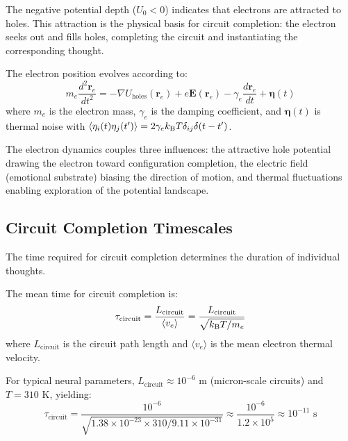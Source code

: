 The negative potential depth ($U_0 < 0$) indicates that electrons are attracted to holes. This attraction is the physical basis for circuit completion: the electron seeks out and fills holes, completing the circuit and instantiating the corresponding thought.

\begin{theorem}
\label{thm:electron_motion}
The electron position evolves according to:
\begin{equation}
m_e \frac{d^2 \mathbf{r}_e}{dt^2} = -\nabla U_{\text{holes}}(\mathbf{r}_e) + e\mathbf{E}(\mathbf{r}_e) - \gamma_e \frac{d\mathbf{r}_e}{dt} + \boldsymbol{\eta}(t)
\label{eq:electron_eom}
\end{equation}
where $m_e$ is the electron mass, $\gamma_e$ is the damping coefficient, and $\boldsymbol{\eta}(t)$ is thermal noise with $\langle \eta_i(t) \eta_j(t') \rangle = 2\gamma_e k_{\mathrm{B}} T \delta_{ij} \delta(t - t')$.
\end{theorem}

The electron dynamics couples three influences: the attractive hole potential drawing the electron toward configuration completion, the electric field (emotional substrate) biasing the direction of motion, and thermal fluctuations enabling exploration of the potential landscape.

\subsection{Circuit Completion Timescales}

The time required for circuit completion determines the duration of individual thoughts.

\begin{theorem}
\label{thm:completion_time}
The mean time for circuit completion is:
\begin{equation}
\tau_{\text{circuit}} = \frac{L_{\text{circuit}}}{\langle v_e \rangle} = \frac{L_{\text{circuit}}}{\sqrt{k_{\mathrm{B}} T / m_e}}
\label{eq:completion_time}
\end{equation}
where $L_{\text{circuit}}$ is the circuit path length and $\langle v_e \rangle$ is the mean electron thermal velocity.
\end{theorem}

For typical neural parameters, $L_{\text{circuit}} \approx 10^{-6}$ m (micron-scale circuits) and $T = 310$ K, yielding:
\begin{equation}
\tau_{\text{circuit}} = \frac{10^{-6}}{\sqrt{1.38 \times 10^{-23} \times 310 / 9.11 \times 10^{-31}}} \approx \frac{10^{-6}}{1.2 \times 10^{5}} \approx 10^{-11} \text{ s}
\end{equation}

